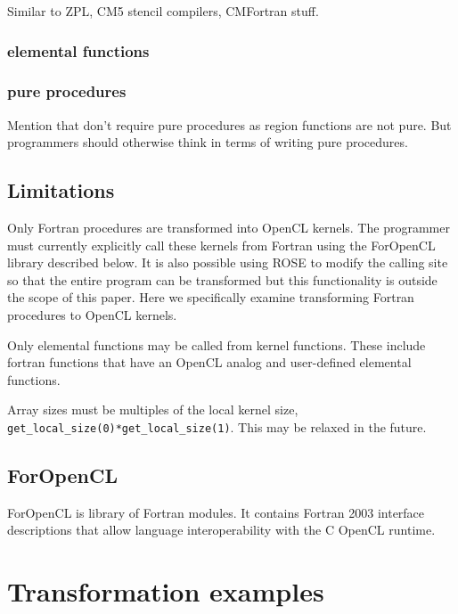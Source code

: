 \documentclass[10pt, conference, compsocconf]{IEEEtran}
\begin{document}
Similar to ZPL, CM5 stencil compilers, CMFortran stuff.


%
% 

\subsubsection{elemental functions}

\subsubsection{pure procedures}

Mention that don't require pure procedures as region functions are not pure.
But programmers should otherwise think in terms of writing pure procedures.

\subsection{Limitations}

Only Fortran procedures are transformed into OpenCL kernels.  The programmer
must currently explicitly call these kernels from Fortran using the ForOpenCL
library described below.  It is also possible using ROSE to modify the calling
site so that the entire program can be transformed but this functionality is
outside the scope of this paper.  Here we specifically examine transforming
Fortran procedures to OpenCL kernels.

Only elemental functions may be called from kernel functions.  These include
fortran functions that have an OpenCL analog and user-defined elemental functions.

Array sizes must be multiples of the local kernel size,
{\tt get\_local\_size(0)*get\_local\_size(1)}.  This may be relaxed in the future.

\subsection{ForOpenCL}

ForOpenCL is library of Fortran modules.  It contains Fortran 2003 interface
descriptions that allow language interoperability with the C OpenCL runtime.

\section{Transformation examples}
\end{document}
